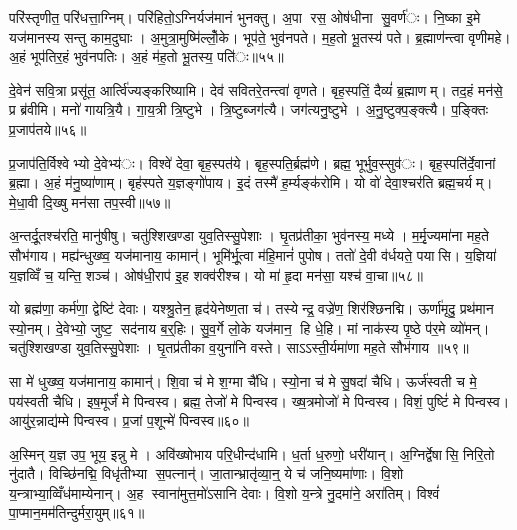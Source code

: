 
परि॑स्तृणीत॒ परि॑धत्ता॒ग्निम्। परि॑हितो॒ऽग्निर्यज॑मानं भुनक्तु। अ॒पा रस॒ ओष॑धीना सु॒वर्ण॑ः। नि॒ष्का इ॒मे यज॑मानस्य सन्तु काम॒दुघाः। अ॒मुत्रा॒मुष्मि॑ल्लोँ॒के। भूप॑ते॒ भुव॑नपते। म॒ह॒तो भू॒तस्य॑ पते। ब्र॒ह्माण॑न्त्वा वृणीमहे। अ॒हं भूप॑तिर॒हं भुव॑नपतिः। अ॒हं म॑ह॒तो भू॒तस्य॒ पति॑ः॥५५॥

दे॒वेन॑ सवि॒त्रा प्रसू॑त॒ आर्त्वि॑ज्यङ्करिष्यामि। देव॑ सवितरे॒तन्त्वा॑ वृणते। बृह॒स्पतिं॒ दैव्यं॑ ब्र॒ह्माणम्। तद॒हं मन॑से॒ प्र ब्र॑वीमि। मनो॑ गायत्रि॒यै। गा॒य॒त्री त्रि॒ष्टुभे। त्रि॒ष्टुब्जग॑त्यै। जग॑त्यनु॒ष्टुभे। अ॒नु॒ष्टुक्प॒ङ्क्त्यै। प॒ङ्क्तिः प्र॒जाप॑तये॥५६॥

प्र॒जाप॑ति॒र्विश्वेभ्यो दे॒वेभ्य॑ः। विश्वे॑ देवा॒ बृह॒स्पत॑ये। बृह॒स्पति॒र्ब्रह्म॑णे। ब्रह्म॒ भूर्भुव॒स्सुव॑ः। बृह॒स्पति॑र्दे॒वानां ब्र॒ह्मा। अ॒हं म॑नु॒ष्या॑णाम्। बृह॑स्पते य॒ज्ञङ्गो॑पाय। इ॒दं तस्मै॑ ह॒र्म्यङ्क॑रोमि। यो वो॑ देवा॒श्चर॑ति ब्रह्म॒चर्यम्। मे॒धा॒वी दि॒ख्षु मन॑सा तप॒स्वी॥५७॥

अ॒न्तर्दू॒तश्च॑रति॒ मानु॑षीषु। चतु॑श्शिखण्डा युव॒तिस्सु॒पेशाः। घृ॒तप्र॑तीका॒ भुव॑नस्य॒ मध्ये। म॒र्मृ॒ज्यमा॑ना मह॒ते सौभ॑गाय। मह्य॑न्धुख्ष्व॒ यज॑मानाय॒ कामान्॑। भूमि॑र्भू॒त्वा म॑हि॒मानं॑ पुपोष। ततो॑ दे॒वी व॑र्धयते॒ पयासि। य॒ज्ञिया॑ य॒ज्ञव्विँ च॒ यन्ति॒ शञ्च॑। ओष॑धी॒राप॑ इ॒ह शक्व॑रीश्च। यो मा॑ हृ॒दा मन॑सा॒ यश्च॑ वा॒चा॥५८॥

यो ब्रह्म॑णा॒ कर्म॑णा॒ द्वेष्टि॑ देवाः। यश्श्रु॒तेन॒ हृद॑येनेष्ण॒ता च॑। तस्येन्द्र॒ वज्रे॑ण॒ शिर॑श्छिनद्मि। ऊर्णा॑मृदु॒ प्रथ॑मान स्यो॒नम्। दे॒वेभ्यो॒ जुष्ट॒ सद॑नाय ब॒र्॒हिः। सु॒व॒र्गे लो॒के यज॑मान॒ हि धे॒हि। मां नाक॑स्य पृ॒ष्ठे प॑र॒मे व्यो॑मन्। चतु॑श्शिखण्डा युव॒तिस्सु॒पेशाः। घृ॒तप्र॑तीका व॒युना॑नि वस्ते। साऽऽस्ती॒र्यमा॑णा मह॒ते सौभ॑गाय ॥५९॥

सा मे॑ धुख्ष्व॒ यज॑मानाय॒ कामान्॑। शि॒वा च॑ मे श॒ग्मा चै॑धि। स्यो॒ना च॑ मे सु॒षदा॑ चैधि। ऊर्ज॑स्वती च मे॒ पय॑स्वती चैधि। इष॒मूर्जं॑ मे पिन्वस्व। ब्रह्म॒ तेजो॑ मे पिन्वस्व। ख्ष॒त्रमोजो॑ मे पिन्वस्व। विशं॒ पुष्टिं॑ मे पिन्वस्व। आयु॑र॒न्नाद्य॑म्मे पिन्वस्व। प्र॒जां प॒शून्मे॑ पिन्वस्व॥६०॥

अ॒स्मिन् य॒ज्ञ उप॒ भूय॒ इन्नु मे। अवि॑ख्षोभाय परि॒धीन्द॑धामि। ध॒र्ता ध॒रुणो॒ धरी॑यान्। अ॒ग्निर्द्वेषासि॒ निरि॒तो नु॑दातै। विच्छि॑नद्मि॒ विधृ॑तीभ्या स॒पत्नान्॑। जा॒तान्भ्रातृ॑व्या॒न्॒ ये च॑ जनि॒ष्यमा॑णाः। वि॒शो य॒न्त्राभ्या॒व्विँध॑माम्येनान्। अ॒ह स्वाना॑मुत्त॒मो॑ऽसानि देवाः। वि॒शो य॒न्त्रे नु॒दमा॑ने॒ अरा॑तिम्। विश्वं॑ पा॒प्मान॒मम॑तिन्दुर्मरा॒युम्॥६१॥

